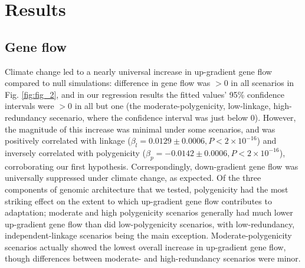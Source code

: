 \documentclass[9pt,twocolumn,twoside,lineno]{pnas-new}
\begin{document}
\section*{Results}

\subsection{Gene flow}
Climate change led to a nearly universal increase in up-gradient gene flow
compared to null simulations: difference in gene flow was $>0$ in all scenarios
in Fig. \ref{fig:fig_2}, and in our regression
results the fitted values' 95\% confidence intervals were $>0$ in all but
one (the moderate-polygenicity, low-linkage, high-redundancy secenario, where the confidence interval was just below 0).
However, the magnitude of this increase was minimal under
some scenarios, and was positively correlated with linkage
($\beta_{l} = 0.0129\pm0.0006, P<2\times10^{-16}$)
and inversely correlated with polygenicity
($\beta_{p} = -0.0142\pm0.0006, P<2\times10^{-16}$),
corroborating our first hypothesis.
Correspondingly, down-gradient gene flow was 
universally suppressed under climate change, as expected.
Of the three components of genomic architecture that we tested,
polygenicity had the most striking effect on the extent to which
up-gradient gene flow contributes to adaptation;
moderate and high polygenicity scenarios generally had much lower
up-gradient gene flow than did low-polygenicity scenarios,
with low-redundancy, independent-linkage scenarios being the main exception.
Moderate-polygenicity scenarios actually showed the lowest overall increase
in up-gradient gene flow, though differences between moderate- and
high-redundancy scenarios were minor.
\end{document}

